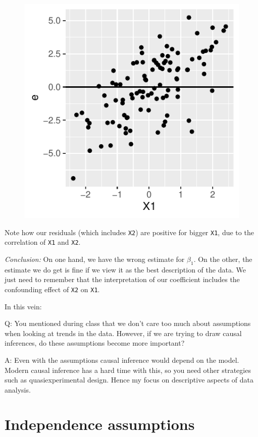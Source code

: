 \documentclass[
  letterpaper,
  DIV=11,
  numbers=noendperiod]{scrreprt}
\begin{document}
\begin{figure}[H]

{\centering \includegraphics{reg_assumptions_files/figure-pdf/unnamed-chunk-4-1.pdf}

}

\end{figure}

Note how our residuals (which includes \texttt{X2}) are positive for
bigger \texttt{X1}, due to the correlation of \texttt{X1} and
\texttt{X2}.

\emph{Conclusion:} On one hand, we have the wrong estimate for
\(\beta_1\). On the other, the estimate we do get is fine if we view it
as the best description of the data. We just need to remember that the
interpretation of our coefficient includes the confounding effect of
\texttt{X2} on \texttt{X1}.

In this vein:

Q: You mentioned during class that we don't care too much about
assumptions when looking at trends in the data. However, if we are
trying to draw causal inferences, do these assumptions become more
important?

A: Even with the assumptions causal inference would depend on the model.
Modern causal inference has a hard time with this, so you need other
strategies such as quasiexperimental design. Hence my focus on
descriptive aspects of data analysis.

\hypertarget{independence-assumptions}{%
\section{Independence assumptions}\label{independence-assumptions}}
\end{document}
